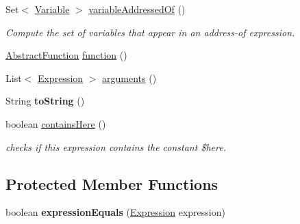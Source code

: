 \begin{DoxyCompactItemize}
Set$<$ \hyperlink{interfaceedu_1_1udel_1_1cis_1_1vsl_1_1civl_1_1model_1_1IF_1_1variable_1_1Variable}{Variable} $>$ \hyperlink{classedu_1_1udel_1_1cis_1_1vsl_1_1civl_1_1model_1_1common_1_1expression_1_1CommonAbstractFunctionCallExpression_a54cbd25de6772b3f6195bbc26caed821}{variable\+Addressed\+Of} ()
\begin{DoxyCompactList}\small\item\em Compute the set of variables that appear in an address-\/of expression. \end{DoxyCompactList}\item 
\hyperlink{interfaceedu_1_1udel_1_1cis_1_1vsl_1_1civl_1_1model_1_1IF_1_1AbstractFunction}{Abstract\+Function} \hyperlink{classedu_1_1udel_1_1cis_1_1vsl_1_1civl_1_1model_1_1common_1_1expression_1_1CommonAbstractFunctionCallExpression_a23e117274e46b3f83cdee749af562ae8}{function} ()
\item 
List$<$ \hyperlink{interfaceedu_1_1udel_1_1cis_1_1vsl_1_1civl_1_1model_1_1IF_1_1expression_1_1Expression}{Expression} $>$ \hyperlink{classedu_1_1udel_1_1cis_1_1vsl_1_1civl_1_1model_1_1common_1_1expression_1_1CommonAbstractFunctionCallExpression_a719f913f2766d9353efa5741c440f776}{arguments} ()
\item 
\hypertarget{classedu_1_1udel_1_1cis_1_1vsl_1_1civl_1_1model_1_1common_1_1expression_1_1CommonAbstractFunctionCallExpression_a386b019eb5b3b7436973305f5f9d9ab7}{}String {\bfseries to\+String} ()\label{classedu_1_1udel_1_1cis_1_1vsl_1_1civl_1_1model_1_1common_1_1expression_1_1CommonAbstractFunctionCallExpression_a386b019eb5b3b7436973305f5f9d9ab7}

\item 
boolean \hyperlink{classedu_1_1udel_1_1cis_1_1vsl_1_1civl_1_1model_1_1common_1_1expression_1_1CommonAbstractFunctionCallExpression_ae923e17a95daeba213b03c23abe508f3}{contains\+Here} ()
\begin{DoxyCompactList}\small\item\em checks if this expression contains the constant \$here. \end{DoxyCompactList}\end{DoxyCompactItemize}
\subsection*{Protected Member Functions}
\begin{DoxyCompactItemize}
\item 
\hypertarget{classedu_1_1udel_1_1cis_1_1vsl_1_1civl_1_1model_1_1common_1_1expression_1_1CommonAbstractFunctionCallExpression_a3815d0f877f00aaeda0fed5b489415a7}{}boolean {\bfseries expression\+Equals} (\hyperlink{interfaceedu_1_1udel_1_1cis_1_1vsl_1_1civl_1_1model_1_1IF_1_1expression_1_1Expression}{Expression} expression)\label{classedu_1_1udel_1_1cis_1_1vsl_1_1civl_1_1model_1_1common_1_1expression_1_1CommonAbstractFunctionCallExpression_a3815d0f877f00aaeda0fed5b489415a7}

\end{DoxyCompactItemize}

